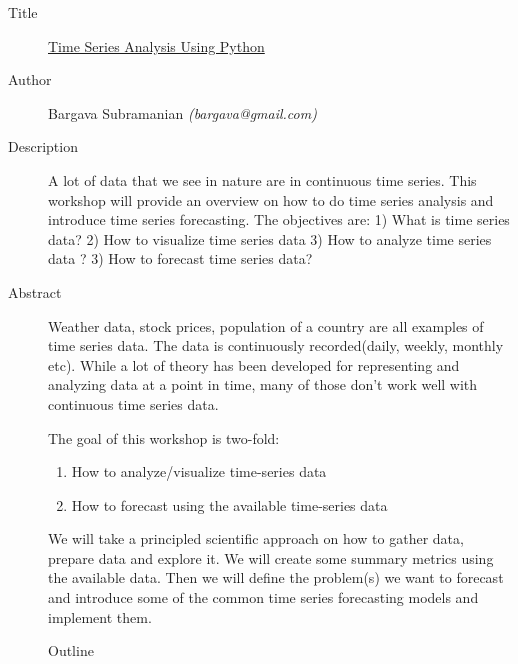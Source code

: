 \begin{description}
   \item[Title] \underline{Time Series Analysis Using Python}
   \item[Author] Bargava Subramanian \emph{(bargava@gmail.com)}
   \item[Description] A lot of data that we see in nature are in continuous time series. This workshop will provide an overview on how to do time series analysis and introduce time series forecasting. The objectives are: 1) What is time series data? 2) How to visualize time series data 3) How to analyze time series data ? 3) How to forecast time series data? 
   \item[Abstract] Weather data, stock prices, population of a country are all examples of time series data. The data is continuously recorded(daily, weekly, monthly etc). While a lot of theory has been developed for representing and analyzing data at a point in time, many of those don't work well with continuous time series data.

The goal of this workshop is two-fold:
\begin{enumerate}
   \item How to analyze/visualize time-series data
   \item How to forecast using the available time-series data
\end{enumerate}
We will take a principled scientific approach on how to gather data, prepare data and explore it. We will create some summary metrics using the available data. Then we will define the problem(s) we want to forecast and introduce some of the common time series forecasting models and implement them.

Outline


\end{description}
